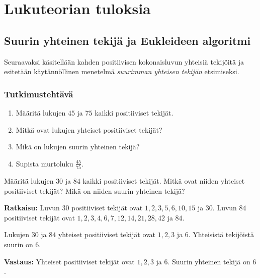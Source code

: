 \chapter{Lukuteorian tuloksia}


\section{Suurin yhteinen tekijä ja Eukleideen algoritmi}
Seuraavaksi käsitellään kahden positiivisen kokonaisluvun yhteisiä tekijöitä ja esitetään käytännöllinen menetelmä {\em suurimman yhteisen tekijän} etsimiseksi.

\subsection*{Tutkimustehtävä}
\begin{enumerate}
\item Määritä lukujen $45$ ja $75$ kaikki positiiviset tekijät.
\item Mitkä ovat lukujen yhteiset positiiviset tekijät?
\item Mikä on lukujen suurin yhteinen tekijä?
\item Supista murtoluku $\frac{45}{75}$.
\end{enumerate}

\begin{esimerkki}
Määritä lukujen $30$ ja $84$ kaikki positiiviset tekijät. Mitkä ovat niiden yhteiset positiiviset tekijät? Mikä on niiden suurin yhteinen tekijä?

{\bf Ratkaisu:} Luvun $30$ positiiviset tekijät ovat $1, 2, 3, 5, 6, 10, 15$ ja $30$. Luvun $84$ positiiviset tekijät ovat $1, 2, 3, 4, 6, 7, 12, 14, 21, 28, 42$ ja $84$.

Lukujen $30$ ja $84$ yhteiset positiiviset tekijät ovat $1, 2, 3$ ja $6$. Yhteisistä tekijöistä suurin on $6$.

{\bf Vastaus:} 
Yhteiset positiiviset tekijät ovat $1, 2, 3$ ja $6$. Suurin yhteinen tekijä on $6$.
\end{esimerkki}


